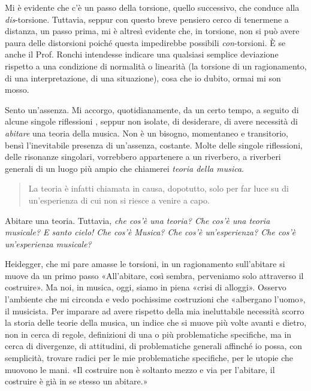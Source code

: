 \documentclass{gs}
\begin{document}
Mi è evidente che c'è un passo della torsione, quello successivo, che conduce alla \emph{dis}-torsione. %
Tuttavia, seppur con questo breve pensiero cerco di tenermene a distanza, un passo prima, mi è altresì evidente che, in torsione, non si può avere paura delle distorsioni poiché questa impedirebbe possibili \emph{con}-torsioni. È se anche il Prof. Ronchi intendesse indicare una qualsiasi semplice deviazione rispetto a una condizione di normalità o linearità (la torsione di un ragionamento, di una interpretazione, di una situazione), cosa che io dubito, ormai mi son mosso.

Sento un'assenza. Mi accorgo, quotidianamente, da un certo tempo, a seguito di alcune singole riflessioni \cite{silvi2023a, silvi2023b, silvi2023c, silvi2024}, seppur non isolate, di desiderare, di avere necessità di \emph{abitare} una teoria della musica. Non è un bisogno, momentaneo e transitorio, bensì l'inevitabile presenza di un'assenza, costante. Molte delle singole riflessioni, delle risonanze singolari, vorrebbero appartenere a un riverbero, a riverberi generali di un luogo più ampio che chiamerei \emph{teoria della musica}. 

\begin{quote}
\begin{sf}
\small
  La teoria è infatti chiamata in causa, dopotutto, solo per far luce su di un'esperienza di cui non si riesce a venire a capo. \cite{ronchi2001}
  \end{sf}
\end{quote}

Abitare una teoria. Tuttavia, \emph{che cos'è una teoria? Che cos'è una teoria musicale? E santo cielo! Che cos'è Musica? Che cos'è un'esperienza? Che cos'è un'esperienza musicale?}

Heidegger, che mi pare amasse le torsioni, in un ragionamento sull'abitare \cite{heidegger1991} si muove da un primo passo «All'abitare, così sembra, perveniamo solo attraverso il costruire». Ma noi, in musica, oggi, siamo in piena «crisi di alloggi». Osservo l'ambiente che mi circonda e vedo pochissime costruzioni che «albergano l'uomo», il musicista. Per imparare ad avere rispetto della mia ineluttabile necessità scorro la storia delle teorie della musica, un indice che si muove più volte avanti e dietro, non in cerca di regole, definizioni di una o più problematiche specifiche, ma in cerca di divergenze, di attitudini, di problematiche generali affinché io possa, con semplicità, trovare radici per le mie problematiche specifiche, per le utopie che muovono le mani. «Il costruire non è soltanto mezzo e via per l'abitare, il costruire è già in se stesso un abitare.» \cite{heidegger1991} %
\end{document}
